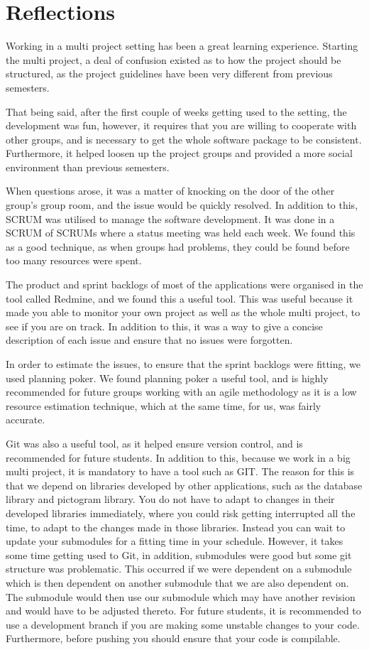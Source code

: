 \chapter{Reflections}
Working in a multi project setting has been a great learning experience.
Starting the multi project, a deal of confusion existed as to how the project should be structured, as the project guidelines have been very different from previous semesters.

That being said, after the first couple of weeks getting used to the setting, the development was fun, however, it requires that you are willing to cooperate with other groups, and is necessary to get the whole software package to be consistent.
Furthermore, it helped loosen up the project groups and provided a more social environment than previous semesters.

When questions arose, it was a matter of knocking on the door of the other group's group room, and the issue would be quickly resolved.
In addition to this, SCRUM was utilised to manage the software development.
It was done in a SCRUM of SCRUMs where a status meeting was held each week.
We found this as a good technique, as when groups had problems, they could be found before too many resources were spent.

The product and sprint backlogs of most of the applications were organised in the tool called Redmine, and we found this a useful tool.
This was useful because it made you able to monitor your own project as well as the whole multi project, to see if you are on track.
In addition to this, it was a way to give a concise description of each issue and ensure that no issues were forgotten.

In order to estimate the issues, to ensure that the sprint backlogs were fitting, we used planning poker.
We found planning poker a useful tool, and is highly recommended for future groups working with an agile methodology as it is a low resource estimation technique, which at the same time, for us, was fairly accurate.

Git was also a useful tool, as it helped ensure version control, and is recommended for future students.
In addition to this, because we work in a big multi project, it is mandatory to have a tool such as GIT.
The reason for this is that we depend on libraries developed by other applications, such as the database library and pictogram library.
You do not have to adapt to changes in their developed libraries immediately, where you could risk getting interrupted all the time, to adapt to the changes made in those libraries. 
Instead you can wait to update your submodules for a fitting time in your schedule.
However, it takes some time getting used to Git, in addition, submodules were good but some git structure was problematic.
This occurred if we were dependent on a submodule which is then dependent on another submodule that we are also dependent on.
The submodule would then use our submodule which may have another revision and would have to be adjusted thereto.
For future students, it is recommended to use a development branch if you are making some unstable changes to your code.
Furthermore, before pushing you should ensure that your code is compilable.

